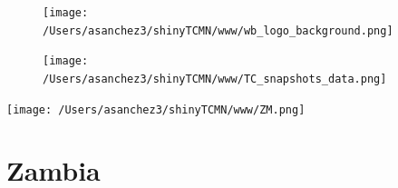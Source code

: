 \documentclass{article}\usepackage[]{graphicx}\usepackage[]{color}
\begin{document}
%

\begin{figure}
  \vspace{-3ex} %
  \hspace{-7ex} %
  \texttt{[image: /Users/asanchez3/shinyTCMN/www/wb\_logo\_background.png]}
\end{figure}
\begin{figure}
  \begin{minipage}[t]{0.99\textwidth} %
      \vspace{-30ex}
      \hspace{-2ex}
      \raggedright{\texttt{[image: /Users/asanchez3/shinyTCMN/www/TC\_snapshots\_data.png]}}
  \end{minipage}
\end{figure}
%
\begin{minipage}[t]{0.99\textwidth} %
  \vspace{-1.5cm}
  \begin{minipage}[c]{0.36\textwidth} 
    \begin{minipage}[c]{0.28\textwidth} %
      \texttt{[image: /Users/asanchez3/shinyTCMN/www/ZM.png]}
    \end{minipage}
    \begin{minipage}[c]{0.70\textwidth} %
      \section*{\color{blue!40!black}Zambia}
    \end{minipage}
  \end{minipage}
  \begin{minipage}[c]{0.63\textwidth} %
    \centering
  \end{minipage}  
\end{minipage} %
\end{document}
